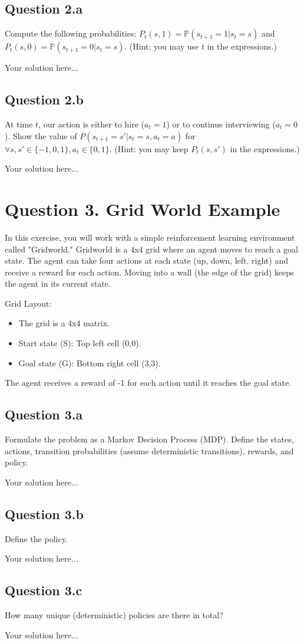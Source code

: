 \documentclass[12pt]{article}
\begin{document}
\subsection*{Question 2.a}  Compute the following probabilities: $P_t(s,1)=\mathbb{P}(s_{t+1}=1|s_t=s)$ and  $P_t(s,0)=\mathbb{P}(s_{t+1}=0|s_t=s)$. (Hint: you may use $t$ in the expressions.)
    \begin{solution}
Your solution here...
\end{solution}
   
\subsection*{Question 2.b}  At time $t$, our action is either to hire ($a_t = 1$) or to continue interviewing ($a_t = 0$). Show the value of $P(s_{t+1}=s'| s_t=s, a_t=a)$ for $ \forall s, s' \in \{-1,0,1\}, a_t \in \{0,1\}$. (Hint: you may keep $P_t(s,s')$ in the expressions.)
    \begin{solution}
Your solution here...
\end{solution}


\section*{Question 3. Grid World Example}

In this exercise, you will work with a simple reinforcement learning environment called "Gridworld." Gridworld is a 4x4 grid where an agent moves to reach a goal state. The agent can take four actions at each state (up, down, left, right) and receive a reward for each action. Moving into a wall (the edge of the grid) keeps the agent in its current state.

Grid Layout:
\begin{itemize}
\item The grid is a 4x4 matrix.
\item Start state (S): Top left cell (0,0).
\item Goal state (G): Bottom right cell (3,3).
\end{itemize}
The agent receives a reward of -1 for each action until it reaches the goal state.


\subsection*{Question 3.a}
Formulate the problem as a Markov Decision Process (MDP). Define the states, actions, transition probabilities (assume deterministic transitions), rewards, and policy.
\begin{solution}
Your solution here...
\end{solution}

\subsection*{Question 3.b} Define the policy.
\begin{solution}
Your solution here...
\end{solution}

\subsection*{Question 3.c} How many unique (deterministic) policies are there in total?
\begin{solution}
Your solution here...
\end{solution}
\end{document}
